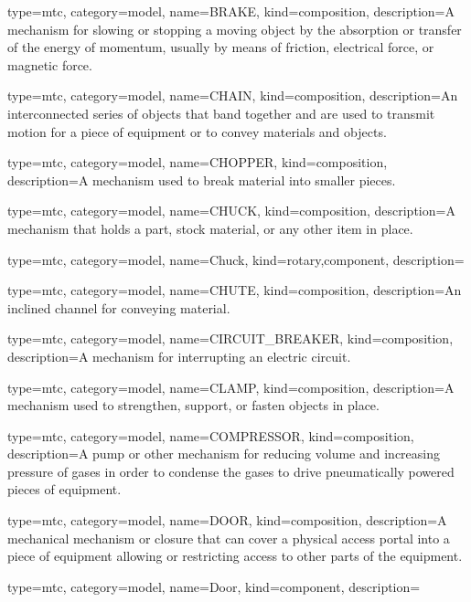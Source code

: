 {
  type=mtc,
  category=model,
  name={BRAKE},
  kind={composition},
  description={A mechanism for slowing or stopping a moving object by the absorption or transfer of the energy of momentum, usually by means of friction, electrical force, or magnetic force.}
}


{
  type=mtc,
  category=model,
  name={CHAIN},
  kind={composition},
  description={An interconnected series of objects that band together and are used to transmit motion for a piece of equipment or to convey materials and objects.}
}


{
  type=mtc,
  category=model,
  name={CHOPPER},
  kind={composition},
  description={A mechanism used to break material into smaller pieces.}
}


{
  type=mtc,
  category=model,
  name={CHUCK},
  kind={composition},
  description={A mechanism that holds a part, stock material, or any other item in place.}
}


{
  type=mtc,
  category=model,
  name={Chuck},
  kind={rotary,component},
  description={}
}


{
  type=mtc,
  category=model,
  name={CHUTE},
  kind={composition},
  description={An inclined channel for conveying material.}
}


{
  type=mtc,
  category=model,
  name={CIRCUIT\_BREAKER},
  kind={composition},
  description={A mechanism for interrupting an electric circuit.}
}


{
  type=mtc,
  category=model,
  name={CLAMP},
  kind={composition},
  description={A mechanism used to strengthen, support, or fasten objects in place.}
}


{
  type=mtc,
  category=model,
  name={COMPRESSOR},
  kind={composition},
  description={A pump or other mechanism for reducing volume and increasing pressure of gases in order to condense the gases to drive pneumatically powered pieces of equipment.}
}


{
  type=mtc,
  category=model,
  name={DOOR},
  kind={composition},
  description={A mechanical mechanism or closure that can cover a physical access portal into a piece of equipment allowing or restricting access to other parts of the equipment.}
}


{
  type=mtc,
  category=model,
  name={Door},
  kind={component},
  description={}
}


